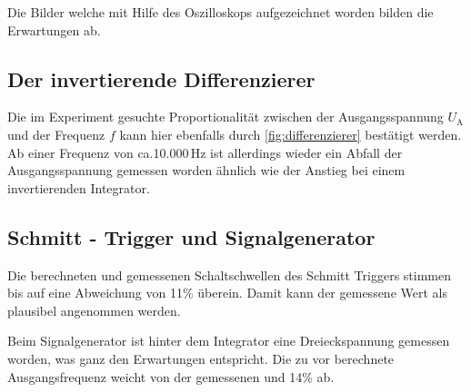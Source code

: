 Die Bilder welche mit Hilfe des Oszilloskops aufgezeichnet worden bilden 
die Erwartungen ab.

\subsection{Der invertierende Differenzierer}
Die im Experiment gesuchte Proportionalität zwischen der Ausgangsspannung $U_\text{A}$ und der Frequenz
$f$ kann hier ebenfalls durch \autoref{fig:differenzierer} bestätigt werden.
Ab einer Frequenz von ca.10.000\,Hz ist allerdings wieder ein Abfall der Ausgangsspannung gemessen worden
ähnlich wie der Anstieg bei einem  invertierenden Integrator.

\subsection{Schmitt - Trigger und Signalgenerator}
Die berechneten und gemessenen Schaltschwellen des Schmitt Triggers stimmen
bis auf eine Abweichung von 11\% überein.
Damit kann der gemessene Wert als plausibel angenommen werden. 

Beim Signalgenerator ist hinter dem Integrator eine Dreieckspannung gemessen worden,
was ganz den Erwartungen entspricht.
Die zu vor berechnete Ausgangsfrequenz weicht von der gemessenen und 14\% ab.